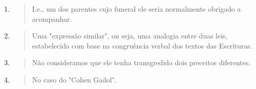 \begin{enumerate}
\def\labelenumi{\arabic{enumi}.}
\setcounter{enumi}{335}
\item
  \begin{quote}
  I.e., um dos parentes cujo funeral ele seria normalmente obrigado a
  acompanhar.
  \end{quote}
\item
  \begin{quote}
  Uma "expressão similar", ou seja, uma analogia entre duas leis,
  estabelecida com base na con­gruência verbal dos textos das
  Escrituras.
  \end{quote}
\item
  \begin{quote}
  Não consideramos que ele tenha transgredido dois preceitos diferentes.
  \end{quote}
\item
  \begin{quote}
  No caso do "Cohen Gadol".
  \end{quote}
\end{enumerate}

